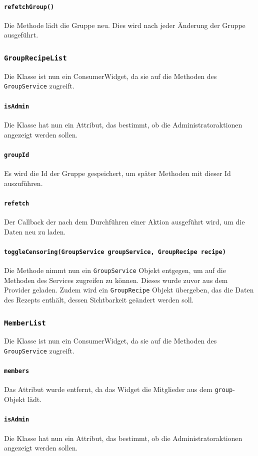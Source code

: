\documentclass{implementierungsheft}
\begin{document}
\paragraph{\texttt{refetchGroup()}}
Die Methode lädt die Gruppe neu. Dies wird nach jeder Änderung der Gruppe ausgeführt.
\subsubsection*{\texttt{GroupRecipeList}}
Die Klasse ist nun ein ConsumerWidget, da sie auf die Methoden des \texttt{GroupService} zugreift.
\paragraph{\texttt{isAdmin}}
Die Klasse hat nun ein Attribut, das bestimmt, ob die Administratoraktionen angezeigt werden sollen.
\paragraph{\texttt{groupId}}
Es wird die Id der Gruppe gespeichert, um später Methoden mit dieser Id auszuführen.
\paragraph{\texttt{refetch}}
Der Callback der nach dem Durchführen einer Aktion ausgeführt wird, um die Daten neu zu laden.
\paragraph{\texttt{toggleCensoring(GroupService groupService, GroupRecipe recipe)}}
Die Methode nimmt nun ein \texttt{GroupService} Objekt entgegen, um auf die Methoden des Services zugreifen zu können. Dieses wurde zuvor aus dem Provider geladen. Zudem wird ein \texttt{GroupRecipe} Objekt übergeben, das die Daten des Rezepts enthält, dessen Sichtbarkeit geändert werden soll.
\subsubsection*{\texttt{MemberList}}
Die Klasse ist nun ein ConsumerWidget, da sie auf die Methoden des \texttt{GroupService} zugreift.
\paragraph{\texttt{members}}
Das Attribut wurde entfernt, da das Widget die Mitglieder aus dem \texttt{group}-Objekt lädt.
\paragraph{\texttt{isAdmin}}
Die Klasse hat nun ein Attribut, das bestimmt, ob die Administratoraktionen angezeigt werden sollen.
\end{document}
